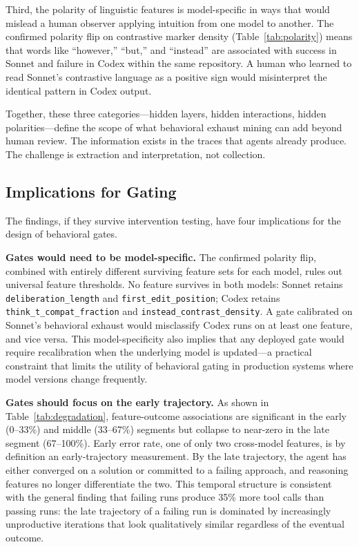 \documentclass[11pt]{article}
\newcommand{\feat}[1]{\texttt{#1}}
\begin{document}
Third, the polarity of linguistic features is model-specific in ways that would mislead a human observer applying intuition from one model to another.
The confirmed polarity flip on contrastive marker density (Table~\ref{tab:polarity}) means that words like ``however,'' ``but,'' and ``instead'' are associated with success in Sonnet and failure in Codex within the same repository.
A human who learned to read Sonnet's contrastive language as a positive sign would misinterpret the identical pattern in Codex output.

Together, these three categories---hidden layers, hidden interactions, hidden polarities---define the scope of what behavioral exhaust mining can add beyond human review.
The information exists in the traces that agents already produce.
The challenge is extraction and interpretation, not collection.

\subsection{Implications for Gating}

The findings, if they survive intervention testing, have four implications for the design of behavioral gates.

\textbf{Gates would need to be model-specific.}
The confirmed polarity flip, combined with entirely different surviving feature sets for each model, rules out universal feature thresholds.
No feature survives in both models: Sonnet retains \feat{deliberation\_length} and \feat{first\_edit\_position}; Codex retains \feat{think\_t\_compat\_fraction} and \feat{instead\_contrast\_density}.
A gate calibrated on Sonnet's behavioral exhaust would misclassify Codex runs on at least one feature, and vice versa.
This model-specificity also implies that any deployed gate would require recalibration when the underlying model is updated---a practical constraint that limits the utility of behavioral gating in production systems where model versions change frequently.

\textbf{Gates should focus on the early trajectory.}
As shown in Table~\ref{tab:degradation}, feature-outcome associations are significant in the early (0--33\%) and middle (33--67\%) segments but collapse to near-zero in the late segment (67--100\%).
Early error rate, one of only two cross-model features, is by definition an early-trajectory measurement.
By the late trajectory, the agent has either converged on a solution or committed to a failing approach, and reasoning features no longer differentiate the two.
This temporal structure is consistent with the general finding that failing runs produce 35\% more tool calls than passing runs: the late trajectory of a failing run is dominated by increasingly unproductive iterations that look qualitatively similar regardless of the eventual outcome.
\end{document}
